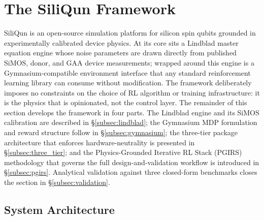
\section{The SiliQun Framework}
\label{sec:framework}

SiliQun is an open-source simulation platform for silicon spin qubits grounded in experimentally calibrated device physics.
At its core sits a Lindblad master equation engine whose noise parameters are drawn directly from published SiMOS, donor, and GAA device measurements; wrapped around this engine is a Gymnasium-compatible environment interface that any standard reinforcement learning library can consume without modification.
The framework deliberately imposes no constraints on the choice of RL algorithm or training infrastructure: it is the physics that is opinionated, not the control layer.
The remainder of this section develops the framework in four parts. The Lindblad engine and its SiMOS calibration are described in \S\ref{subsec:lindblad}; the Gymnasium MDP formulation and reward structure follow in \S\ref{subsec:gymnasium}; the three-tier package architecture that enforces hardware-neutrality is presented in \S\ref{subsec:three_tier}; and the Physics-Grounded Iterative RL Stack (PGIRS) methodology that governs the full design-and-validation workflow is introduced in \S\ref{subsec:pgirs}. Analytical validation against three closed-form benchmarks closes the section in \S\ref{subsec:validation}.

\subsection{System Architecture}
\label{subsec:sdqf_arch}

